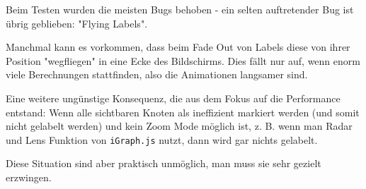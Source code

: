 
Beim Testen wurden die meisten Bugs behoben - ein selten auftretender Bug ist übrig geblieben:
"Flying Labels".

Manchmal kann es vorkommen, dass beim Fade Out von Labels diese von ihrer Position "wegfliegen" in eine Ecke des Bildschirms.
Dies fällt nur auf, wenn enorm viele Berechnungen stattfinden, also die Animationen langsamer sind.

Eine weitere ungünstige Konsequenz, die aus dem Fokus auf die Performance entstand:
Wenn alle sichtbaren Knoten als ineffizient markiert werden (und somit nicht gelabelt werden) und kein Zoom Mode möglich ist, z. B. wenn man Radar und Lens Funktion von \texttt{iGraph.js} nutzt,
dann wird gar nichts gelabelt.

Diese Situation sind aber praktisch unmöglich, man muss sie sehr gezielt erzwingen.